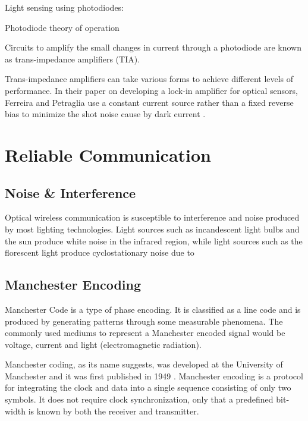 Light sensing using photodiodes:

Photodiode theory of operation


Circuits to amplify the small changes in current through a photodiode are known as trans-impedance amplifiers (TIA).

Trans-impedance amplifiers can take various forms to achieve different levels of performance. In their paper on developing a lock-in amplifier for optical sensors, Ferreira and Petraglia use a constant current source rather than a fixed reverse bias to minimize the shot noise cause by dark current \cite{Ferreira2017}.


\section{Reliable Communication}

\subsection{Noise \& Interference}

Optical wireless communication is susceptible to interference and noise produced by most lighting technologies. Light sources such as incandescent light bulbs and the sun produce white noise in the infrared region, while light sources such as the florescent light produce cyclostationary noise due to 






\subsection{Manchester Encoding}
\label{sec:manchester_encoding}
Manchester Code is a type of phase encoding. It is classified as a line code and is produced by generating patterns through some measurable phenomena. The commonly used mediums to represent a Manchester encoded signal would be voltage, current and light (electromagnetic radiation).

Manchester coding, as its name suggests, was developed at the University of Manchester and it was first published in 1949 \cite{Jameel2019}. Manchester encoding is a protocol for integrating the clock and data into a single sequence consisting of only two symbols. It does not require clock synchronization, only that a predefined bit-width is known by both the receiver and transmitter. 

